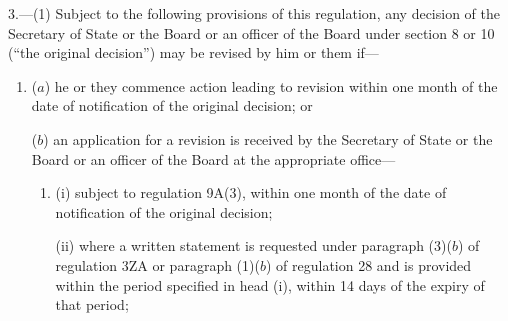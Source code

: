 \documentclass[12pt,a4paper]{article}
\begin{document}
3.—(1) Subject to the following provisions of this regulation, any decision of the Secretary of State 
or the Board or an officer of the Board  %
under section 8 or 10 (“the original decision”) may be revised by him 
or them  %
if—
\begin{enumerate}\item[]

%
%
%
%

($a$) he or they commence action leading to revision within one month of the date of notification of the original decision; or

($b$) an application for a revision is received by the Secretary of State or the Board or an officer of the Board at the appropriate office—
\begin{enumerate}\item[]
(i) subject to regulation 9A(3), within one month of the date of notification of the original decision;

(ii) where a written statement is requested under 
paragraph (3)($b$)  of regulation 3ZA or  %
paragraph (1)($b$)  of regulation 28 and is provided within the period specified in head (i), within 14 days of the expiry of that period;


\end{enumerate}
\end{enumerate}
\end{document}
